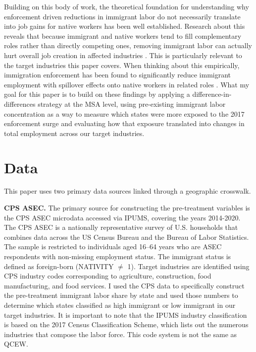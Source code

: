 \documentclass[12pt]{article}
\begin{document}
Building on this body of work, the theoretical foundation for understanding why enforcement driven reductions in immigrant labor do not necessarily translate into job gains for native workers has been well established. Research about this reveals that because immigrant and native workers tend to fill complementary roles rather than directly competing ones, removing immigrant labor can actually hurt overall job creation in affected industries \citep{chassamboulli2015}. This is particularly relevant to the target industries this paper covers. When thinking about this empirically, immigration enforcement has been found to significantly reduce immigrant employment with spillover effects onto native workers in related roles \citep{east2023}. What my goal for this paper is to build on these findings by applying a difference-in-differences strategy at the MSA level, using pre-existing immigrant labor concentration as a way to measure which states were more exposed to the 2017 enforcement surge and evaluating how that exposure translated into changes in total employment across our target industries.

 
\section{Data}
 
This paper uses two primary data sources linked through a geographic
crosswalk.
 
\textbf{CPS ASEC.} The primary source for constructing the pre-treatment variables is the CPS ASEC microdata accessed via IPUMS, covering the years 2014-2020. The CPS ASEC is a nationally representative survey of U.S. households that combines data across the US Census Bureau and the Bureau of Labor Statistics. The sample is restricted to individuals
aged 16--64 years who are ASEC respondents with non-missing employment status. The immigrant status is defined as foreign-born (NATIVITY $\neq$ 1). Target industries are identified using CPS industry codes corresponding to agriculture, construction, food manufacturing, and food services. I used the CPS data to specifically construct the pre-treatment immigrant labor share by state and used those numbers to determine which states classified as high immigrant or low immigrant in our target industries. It is important to note that the IPUMS industry classification is based on the 2017 Census Classification Scheme, which lists out the numerous industries that compose the labor force. This code system is not the same as QCEW. 
 
\end{document}
